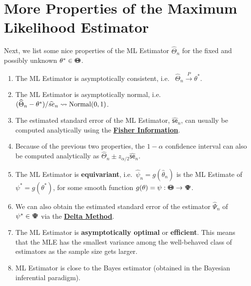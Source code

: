 \section{More Properties of the Maximum Likelihood Estimator}\label{S:PropsMLE}
Next, we list some nice properties of the ML Estimator $\widehat{\Theta}_n$ for the fixed and possibly unknown $\theta^* \in {\Theta}\mspace{-11 mu}{\Theta}$.
\begin{enumerate}
\item The ML Estimator is asymptotically consistent, i.e.~
$\widehat{\Theta}_n \overset{P}{\longrightarrow} \theta^*$.
\item The ML Estimator is asymptotically normal, i.e.~
$(\widehat{\Theta}_n - \theta^*) / \widehat{se}_n \rightsquigarrow \mbox{{\rm Normal}}(0,1)$.
\item The estimated standard error of the ML Estimator, $\widehat{\mathsf{se}}_n$, can usually be computed analytically using the \hyperref[S:FisherInfo]{\bf Fisher Information}.
\item Because of the previous two properties, the $1-\alpha$ confidence interval can also be computed analytically as $\widehat{\Theta}_n \pm z_{\alpha/2} \widehat{\mathsf{se}}_n$.
\item The ML Estimator is {\bf equivariant}, i.e.~$\widehat{\psi}_n=g(\widehat{\theta}_n)$ is the ML Estimate of $\psi^*=g(\theta^*)$, for some smooth function $g(\theta)=\psi: {\Theta}\mspace{-11 mu}{\Theta} \to {\Psi}\mspace{-11 mu}{\Psi}$.  
\item We can also obtain the estimated standard error of the estimator 
$\widehat{\Psi}_n$ of $\psi^* \in {\Psi}\mspace{-11 mu}{\Psi}$ via the \hyperref[S:DeltaMethod]{\bf Delta Method}.
\item The ML Estimator is {\bf asymptotically optimal} or {\bf efficient}.  This means that the MLE has the smallest variance among the well-behaved class of estimators as the sample size gets larger.
\item ML Estimator is close to the Bayes estimator (obtained in the Bayesian inferential paradigm).
\end{enumerate}

